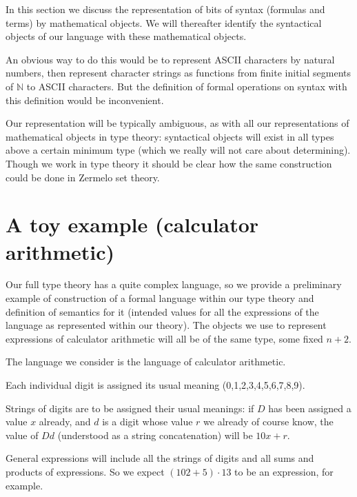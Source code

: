 \documentclass[12pt]{book}
\begin{document}

In this section we discuss the representation of bits of syntax
(formulas and terms) by mathematical objects.  We will thereafter
identify the syntactical objects of our language with these
mathematical objects.

An obvious way to do this would be to represent ASCII characters by
natural numbers, then represent character strings as functions from
finite initial segments of $\mathbb N$ to ASCII characters.  But the
definition of formal operations on syntax with this definition would
be inconvenient.

Our representation will be typically ambiguous, as with all our
representations of mathematical objects in type theory: syntactical
objects will exist in all types above a certain minimum type (which we
really will not care about determining).  Though we work in type
theory it should be clear how the same construction could be done in
Zermelo set theory.

\newpage

\section{A toy example (calculator arithmetic)}

Our full type theory has a quite complex language, so we provide a preliminary example of construction of a formal language within our type theory
and definition of semantics for it (intended values for all the expressions of the language as represented within our theory).  The objects we use to represent expressions of calculator arithmetic will all be of the same type, some fixed $n+2$.

The language we consider is the language of calculator arithmetic.

Each individual digit is assigned its usual meaning (0,1,2,3,4,5,6,7,8,9).

Strings of digits are to be assigned their usual meanings:  if $D$ has been assigned a value $x$
already, and $d$ is a digit whose value $r$ we already of course know, the value of $Dd$ (understood as a string concatenation)
will be $10x+r$.

General expressions will include all the strings of digits and all sums and products of expressions.
So we expect $(102+5)\cdot 13$ to be an expression, for example.
\end{document}
